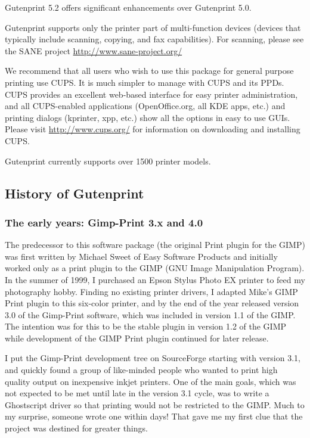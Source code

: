 \documentclass{article}[letter]
\begin{document}
Gutenprint 5.2 offers significant enhancements over Gutenprint 5.0.

Gutenprint supports only the printer part of multi-function devices
(devices that typically include scanning, copying, and fax
capabilities). For scanning, please see the SANE project
\url{http://www.sane-project.org/}

We recommend that all users who wish to use this package for general
purpose printing use CUPS. It is much simpler to manage with CUPS and
its PPDs. CUPS provides an excellent web-based interface for easy
printer administration, and all CUPS-enabled applications
(OpenOffice.org, all KDE apps, etc.) and printing dialogs (kprinter,
xpp, etc.) show all the options in easy to use GUIs. Please visit
\url{http://www.cups.org/} for information on downloading and installing
CUPS.

Gutenprint currently supports over 1500 printer models.

\subsection{History of Gutenprint}

\subsubsection{The early years: Gimp-Print 3.x and 4.0}

The predecessor to this software package (the original Print plugin
for the GIMP) was first written by Michael Sweet of Easy Software
Products and initially worked only as a print plugin to the GIMP (GNU
Image Manipulation Program). In the summer of 1999, I purchased an
Epson Stylus Photo EX printer to feed my photography hobby. Finding no
existing printer drivers, I adapted Mike's GIMP Print plugin to this
six-color printer, and by the end of the year released version 3.0 of
the Gimp-Print software, which was included in version 1.1 of the
GIMP.  The intention was for this to be the stable plugin in version
1.2 of the GIMP while development of the GIMP Print plugin continued
for later release.

I put the Gimp-Print development tree on SourceForge starting with
version 3.1, and quickly found a group of like-minded people who
wanted to print high quality output on inexpensive inkjet
printers. One of the main goals, which was not expected to be met
until late in the version 3.1 cycle, was to write a Ghostscript driver
so that printing would not be restricted to the GIMP. Much to my
surprise, someone wrote one within days! That gave me my first clue
that the project was destined for greater things.
\end{document}
